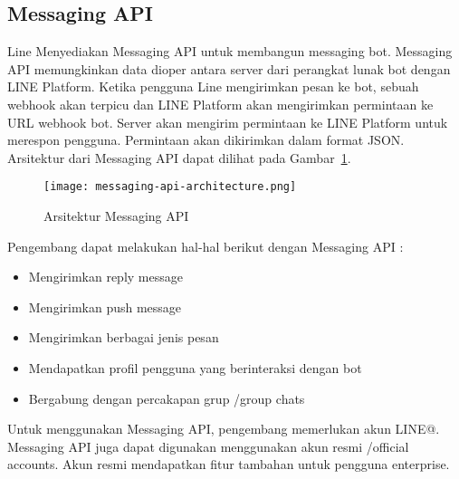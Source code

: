 \subsection{Messaging API } 
Line Menyediakan Messaging API untuk membangun messaging bot. Messaging API memungkinkan data dioper antara server dari perangkat lunak bot dengan LINE Platform. Ketika pengguna Line mengirimkan pesan ke bot, sebuah webhook akan terpicu dan LINE Platform akan mengirimkan permintaan ke URL webhook bot. Server akan mengirim permintaan ke LINE Platform untuk merespon pengguna. Permintaan akan dikirimkan dalam format JSON. Arsitektur dari Messaging API dapat dilihat pada Gambar~\ref{fig:messaging_api_architecture}.

\begin{figure}[H]
	\centering  
	\texttt{[image: messaging-api-architecture.png]}  
	\caption[Arsitektur Messaging API]{Arsitektur Messaging API} 
	\label{fig:messaging_api_architecture} 
\end{figure}

Pengembang dapat melakukan hal-hal berikut dengan Messaging API :
\begin{itemize}
\item Mengirimkan reply message
\item Mengirimkan push message
\item Mengirimkan berbagai jenis pesan
\item Mendapatkan profil pengguna yang berinteraksi dengan bot
\item Bergabung dengan percakapan grup /group chats
\end{itemize}

Untuk menggunakan Messaging API, pengembang memerlukan akun LINE@. Messaging API juga dapat digunakan menggunakan akun resmi /official accounts. Akun resmi mendapatkan fitur tambahan untuk pengguna enterprise.

